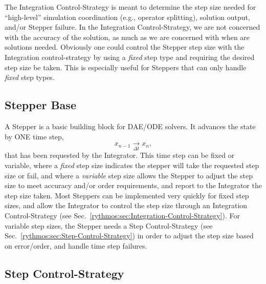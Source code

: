 The Integration Control-Strategy is meant to determine the step size
needed for ``high-level'' simulation coordination (e.g., operator
splitting), solution output, and/or Stepper failure. In the Integration
Control-Strategy, we are not concerned with the accuracy of the solution,
as much as we are concerned with when are solutions needed. Obviously
one could control the Stepper step size with the Integration control-strategy
by using a \emph{fixed} step type and requiring the desired step size
be taken. This is especially useful for Steppers that can only handle
\emph{fixed} step types.


\subsection{Stepper Base}

A Stepper is a basic building block for DAE/ODE solvers. It advances
the state by ONE time step,
\[
x_{n-1}\underset{\Delta t}{\longrightarrow}x_{n},
\]
that has been requested by the Integrator. This time step can be fixed
or variable, where a \emph{fixed }step size indicates the stepper
will take the requested step size or fail, and where a \emph{variable}
step size allows the Stepper to adjust the step size to meet accuracy
and/or order requirements, and report to the Integrator the step size
taken. Most Steppers can be implemented very quickly for fixed step
sizes, and allow the Integrator to control the step size through an
Integration Control-Strategy (see Sec.~\ref{rythmos:sec:Integration-Control-Strategy}).
For variable step sizes, the Stepper needs a Step Control-Strategy
(see Sec.~\ref{rythmos:sec:Step-Control-Strategy}) in order to adjust
the step size based on error/order, and handle time step failures.


\subsection{Step Control-Strategy\label{rythmos:sec:Step-Control-Strategy}}

